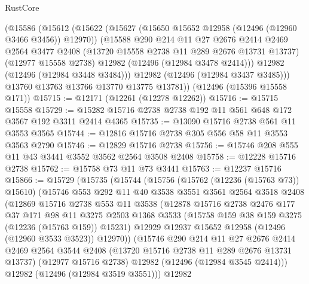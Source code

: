 \begin{lexlean}{RustCore}
\begin{coremodule}
      (@15586
        (@15612
          (@15622
            (@15627 (@15650 @15652 @12958 (@12496 (@12960 @3466 @3456)) @12970))
            (@15588
              @290
              @214
              @11
              @27
              @2676
              @2414
              @2469
              @2564
              @3477
              @2408
              (@13720 @15558 @2738 @11 @289 @2676 @13731 @13737)
              (@12977 @15558 @2738)
              @12982
              (@12496 (@12984 @3478 @2414)))
            @12982
            (@12496 (@12984 @3448 @3484)))
          @12982
          (@12496 (@12984 @3437 @3485)))
        @13760
        @13763
        @13766
        @13770
        @13775
        @13781))
    (@12496 (@15396 @15558 @171))
@15715 := @12171 (@12261 (@12278 @12262))
@15716 := @15715 @15558
@15729 := @15282 @15716 @2738 @2738 @192 @11 @561 @648 @172 @3567 @192 @3311 @2414 @4365
@15735 := @13090 @15716 @2738 @561 @11 @3553 @3565
@15744 := @12816 @15716 @2738 @305 @556 @58 @11 @3553 @3563 @2790
@15746 := @12829 @15716 @2738
@15756 := @15746 @208 @555 @11 @43 @3441 @3552 @3562 @2564 @3508 @2408
@15758 := @12228 @15716 @2738
@15762 := @15758 @73 @11 @73 @3441
@15763 := @12237 @15716
@15866 := @15729
    (@15735
      (@15744
        (@15756
          (@15762 (@12236 (@15763 @73)) @15610)
          (@15746
            @553
            @292
            @11
            @40
            @3538
            @3551
            @3561
            @2564
            @3518
            @2408
            (@12869
              @15716
              @2738
              @553
              @11
              @3538
              (@12878
                @15716
                @2738
                @2476
                @177
                @37
                @171
                @98
                @11
                @3275
                @2503
                @1368
                @3533
                (@15758 @159 @38 @159 @3275 (@12236 (@15763 @159)) @15231)
                @12929
                @12937
                @15652
                @12958
                (@12496 (@12960 @3533 @3523))
                @12970))
            (@15746
              @290
              @214
              @11
              @27
              @2676
              @2414
              @2469
              @2564
              @3544
              @2408
              (@13720 @15716 @2738 @11 @289 @2676 @13731 @13737)
              (@12977 @15716 @2738)
              @12982
              (@12496 (@12984 @3545 @2414)))
            @12982
            (@12496 (@12984 @3519 @3551)))
          @12982

\end{coremodule}
\end{lexlean}

